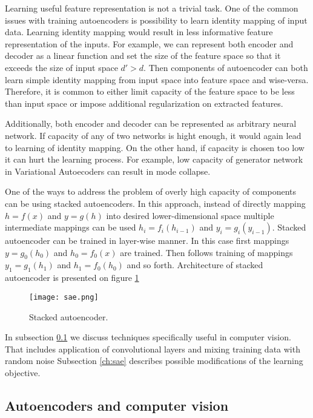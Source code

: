 Learning useful feature representation is not a trivial task.
One of the common issues with training autoencoders is possibility to learn identity mapping of input data.
Learning identity mapping would result in less informative feature representation of the inputs.
For example, we can represent both encoder and decoder as a linear function and set the size of the feature space so that it exceeds the size of input space $d' > d$.
Then components of autoencoder can both learn simple identity mapping from input space into feature space and wise-versa.
Therefore, it is common to either limit capacity of the feature space to be less than input space or impose additional regularization on extracted features.

Additionally, both encoder and decoder can be represented as arbitrary neural network.
If capacity of any of two networks is hight enough, it would again lead to learning of identity mapping.
On the other hand, if capacity is chosen too low it can hurt the learning process.
For example, low capacity of generator network in Variational Autoecoders can result in mode collapse.

One of the ways to address the problem of overly high capacity of components can be using stacked autoencoders.
In this approach, instead of directly mapping $h=f(x)$ and $y=g(h)$ into desired lower-dimensional space multiple intermediate mappings can be used $h_i=f_i(h_{i-1})$ and $y_i=g_i(y_{i-1})$.
Stacked autoencoder can be trained in layer-wise manner.
In this case first mappings $y=g_0(h_0)$ and $h_0=f_0(x)$ are trained.
Then follows training of mappings $y_1=g_1(h_1)$ and $h_1=f_0(h_0)$ and so forth.
Architecture of stacked autoencoder is presented on figure \ref{fig:sae}

\begin{figure}[h!]
  \centering
    \texttt{[image: sae.png]}
  \caption{Stacked autoencoder.}
  \label{fig:sae}
\end{figure}



In subsection \ref{ch:dcae} we discuss techniques specifically useful in computer vision.
That includes application of convolutional layers and mixing training data with random noise
Subsection \ref{ch:sae} describes possible modifications of the learning objective.


\subsection{Autoencoders and computer vision}\label{ch:dcae}

